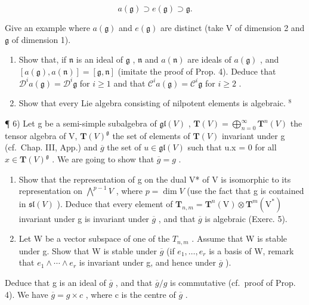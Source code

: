 \[
a (\mathfrak {g}) \supset e (\mathfrak {g}) \supset \mathfrak {g}.
\]

Give an example where \(a(\mathfrak{g})\) and \(e(\mathfrak{g})\) are distinct (take V of dimension 2 and \(\mathfrak{g}\) of dimension 1).

\begin{enumerate}
\def\labelenumi{\alph{enumi})}
\setcounter{enumi}{1}
\item
  Show that, if \(\mathfrak{n}\) is an ideal of \(\mathfrak{g}\) , \(\mathfrak{n}\) and \(a(\mathfrak{n})\) are ideals of \(a(\mathfrak{g})\) , and \([a(\mathfrak{g}), a(\mathfrak{n})] = [\mathfrak{g}, \mathfrak{n}]\) (imitate the proof of Prop. 4). Deduce that \(\mathcal{D}^i a(\mathfrak{g}) = \mathcal{D}^i \mathfrak{g}\) for \(i \geq 1\) and that \(\mathcal{C}^i a(\mathfrak{g}) = \mathcal{C}^i \mathfrak{g}\) for \(i \geq 2\) .
\item
  Show that every Lie algebra consisting of nilpotent elements is algebraic. \(^{8}\)
\end{enumerate}

¶ 6) Let g be a semi-simple subalgebra of \(\mathfrak{gl}(V)\) , \(\mathbf{T}(V) = \bigoplus_{n=0}^{\infty} \mathbf{T}^{n}(V)\) the tensor algebra of V, \(\mathbf{T}(V)^{\mathfrak{g}}\) the set of elements of \(\mathbf{T}(V)\) invariant under g (cf.~Chap. III, App.) and \(\overline{g}\) the set of \(u \in \mathfrak{gl}(V)\) such that u.x = 0 for all \(x \in \mathbf{T}(V)^{\mathfrak{g}}\) . We are going to show that \(\overline{g} = g\) .

\begin{enumerate}
\def\labelenumi{\alph{enumi})}
\item
  Show that the representation of g on the dual V* of V is isomorphic to its representation on \(\bigwedge^{p-1}V\) , where \(p = \dim V\) (use the fact that g is contained in \(\mathfrak{sl}(V)\) ). Deduce that every element of \(\mathbf{T}_{n,m} = \mathbf{T}^{n}(\mathrm{V}) \otimes \mathbf{T}^{m}(\mathrm{V}^{*})\) invariant under g is invariant under \(\overline{g}\) , and that \(\overline{g}\) is algebraic (Exerc. 5).
\item
  Let W be a vector subspace of one of the \(T_{n,m}\) . Assume that W is stable under g. Show that W is stable under \(\overline{g}\) (if \(e_{1},\ldots,e_{r}\) is a basis of W, remark that \(e_{1}\wedge\cdots\wedge e_{r}\) is invariant under g, and hence under \(\overline{g}\) ).
\end{enumerate}

Deduce that g is an ideal of \(\overline{g}\) , and that \(\overline{g}/g\) is commutative (cf.~proof of Prop. 4). We have \(\overline{g} = g \times c\) , where c is the centre of \(\overline{g}\) .

